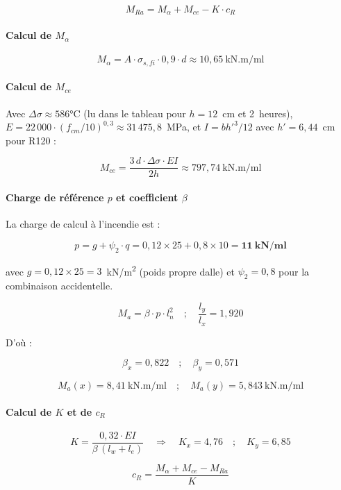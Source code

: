 \[
M_{Ra} = M_\alpha + M_{ce} - K \cdot c_R
\]

\paragraph{Calcul de \texorpdfstring{$M_\alpha$}{Mα}}

\[
M_\alpha = A \cdot \sigma_{s,fi} \cdot 0{,}9 \cdot d \approx 10{,}65~\text{kN.m/ml}
\]

\paragraph{Calcul de \texorpdfstring{$M_{ce}$}{Mce}}

Avec $\Delta\sigma \approx 586$°C (lu dans le tableau pour $h = 12$~cm et 2~heures), $E = 22\,000 \cdot (f_{cm}/10)^{0{,}3} \approx 31\,475{,}8$~MPa, et $I = b h'^3 / 12$ avec $h' = 6{,}44$~cm pour R120 :

\[
M_{ce} = \frac{3 \, d \cdot \Delta\sigma \cdot EI}{2h} \approx 797{,}74~\text{kN.m/ml}
\]

\paragraph{Charge de référence $p$ et coefficient $\beta$}

La charge de calcul à l'incendie est :

\[
p = g + \psi_2 \cdot q = 0{,}12 \times 25 + 0{,}8 \times 10 = \mathbf{11~\text{kN/ml}}
\]

avec $g = 0{,}12 \times 25 = 3$~kN/m\textsuperscript{2} (poids propre dalle) et $\psi_2 = 0{,}8$ pour la combinaison accidentelle.

\[
M_a = \beta \cdot p \cdot l_n^2
\quad ; \quad
\frac{l_y}{l_x} = 1{,}920
\]

D'où :

\[
\beta_x = 0{,}822
\quad ; \quad
\beta_y = 0{,}571
\]

\[
M_a(x) = 8{,}41~\text{kN.m/ml}
\quad ; \quad
M_a(y) = 5{,}843~\text{kN.m/ml}
\]

\paragraph{Calcul de $K$ et de $c_R$}

\[
K = \frac{0{,}32 \cdot EI}{\beta \, (l_w + l_e)}
\quad\Longrightarrow\quad
K_x = 4{,}76 \quad ; \quad K_y = 6{,}85
\]

\[
c_R = \frac{M_\alpha + M_{ce} - M_{Ra}}{K}
\]

